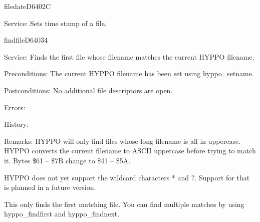 \newpage
\begin{hyppotrap}{filedate}{D640}{2C}
\item [Service:]
  Sets time stamp of a file.
\notimplemented
\end{hyppotrap}


%
\newpage
\begin{hyppotrap}{findfile}{D640}{34}
\item [Service:]
  Finds the first file whose filename matches the current HYPPO filename.
\item [Preconditions:]
  The current HYPPO filename has been set using hyppo\_setname.
\item [Postconditions:]
  No additional file descriptors are open.
\item [Errors:]
\item [History:]
\item [Remarks:]
  HYPPO will only find files whose long filename is all in uppercase.
  HYPPO converts the current filename to ASCII uppercase before trying
  to match it. Bytes \$61 -- \$7B change to \$41 -- \$5A.

  HYPPO does not yet support the wildcard characters * and ?. Support
  for that is planned in a future version.

  This only finds the first matching file. You can find multiple matches by
  using hyppo\_findfirst and hyppo\_findnext.
\end{hyppotrap}


